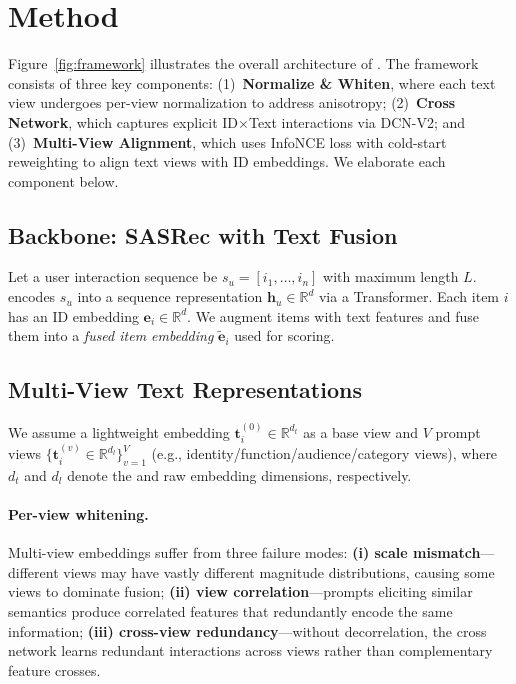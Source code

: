 \section{Method}
Figure~\ref{fig:framework} illustrates the overall architecture of \model.
The framework consists of three key components:
(1)~\textbf{Normalize \& Whiten}, where each text view undergoes per-view normalization to address anisotropy;
(2)~\textbf{Cross Network}, which captures explicit ID$\times$Text interactions via DCN-V2;
and (3)~\textbf{Multi-View Alignment}, which uses InfoNCE loss with cold-start reweighting to align text views with ID embeddings.
We elaborate each component below.

\subsection{Backbone: SASRec with Text Fusion}
Let a user interaction sequence be $s_u = [i_1,\dots,i_n]$
with maximum length $L$. \base encodes $s_u$ into a sequence
representation $\mathbf{h}_u \in \mathbb{R}^d$ via a
Transformer. Each item $i$ has an ID embedding
$\mathbf{e}_i \in \mathbb{R}^d$. We augment items with text
features and fuse them into a \emph{fused item embedding}
$\tilde{\mathbf{e}}_i$ used for scoring.

\subsection{Multi-View Text Representations}
We assume a lightweight \tfidf embedding $\mathbf{t}_i^{(0)} \in \mathbb{R}^{d_t}$
as a base view and $V$ \llm prompt views
$\{\mathbf{t}_i^{(v)} \in \mathbb{R}^{d_l}\}_{v=1}^V$ (e.g.,
identity/function/audience/category views), where $d_t$ and $d_l$ denote the
\tfidf and raw \llm embedding dimensions, respectively.

\paragraph{Per-view whitening.}
Multi-view \llm embeddings suffer from three failure modes:
\textbf{(i) scale mismatch}---different views may have vastly
different magnitude distributions, causing some views to
dominate fusion; \textbf{(ii) view correlation}---prompts
eliciting similar semantics produce correlated features that
redundantly encode the same information; \textbf{(iii)
cross-view redundancy}---without decorrelation, the cross
network learns redundant interactions across views rather than
complementary feature crosses.


